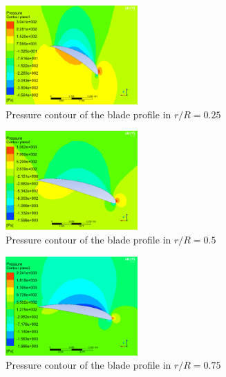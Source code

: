 \begin{figure}[H]
\begin{center}
  \includegraphics[width=0.45\textwidth]{fig1}
\caption{Pressure contour of the blade profile in $r/R=0.25$}
\label{fig:4}
\end{center}       %
\end{figure}

\begin{figure}[H]
\begin{center}
  \includegraphics[width=0.45\textwidth]{fig2}
\caption{Pressure contour of the blade profile in $r/R=0.5$}
\label{fig:5}       %
\end{center}
\end{figure}

\begin{figure}[H]
\begin{center}
  \includegraphics[width=0.45\textwidth]{fig3}
\caption{Pressure contour of the blade profile in $r/R=0.75$}
\label{fig:6}       %
\end{center}
\end{figure}

